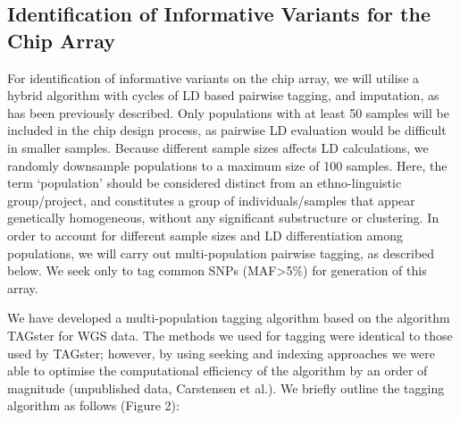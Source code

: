 \subsection{Identification of Informative Variants for the Chip Array}

For identification of informative variants on the chip array, we will utilise a hybrid algorithm with cycles of LD based pairwise tagging, and imputation, as has been previously described.\cite{Hoffmann2011422} Only populations with at least 50 samples will be included in the chip design process, as pairwise LD evaluation would be difficult in smaller samples. Because different sample sizes affects LD calculations,\cite{Jorde2000}\cite{Peer2006} we randomly downsample populations to a maximum size of 100 samples. Here, the term ‘population’ should be considered distinct from an ethno-linguistic group/project, and constitutes a group of individuals/samples that appear genetically homogeneous, without any significant substructure or clustering. In order to account for different sample sizes and LD differentiation among populations, we will carry out multi-population pairwise tagging, as described below. We seek only to tag common SNPs (MAF\textgreater5\%) for generation of this array.

We have developed a multi-population tagging algorithm based on the algorithm TAGster for WGS data.\cite{Xu2007} The methods we used for tagging were identical to those used by TAGster; however, by using seeking and indexing approaches we were able to optimise the computational efficiency of the algorithm by an order of magnitude (unpublished data, Carstensen et al.). We briefly outline the tagging algorithm as follows (Figure 2):


